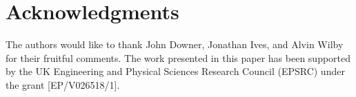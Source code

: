 \documentclass[runningheads]{llncs}
\begin{document}

\section*{Acknowledgments}
The authors would like to thank John Downer, Jonathan Ives, and Alvin Wilby for their fruitful comments. The work presented in this paper has been supported by the UK Engineering and Physical Sciences Research Council (EPSRC) under the grant [EP/V026518/1].

%
%
%

%
\end{document}
